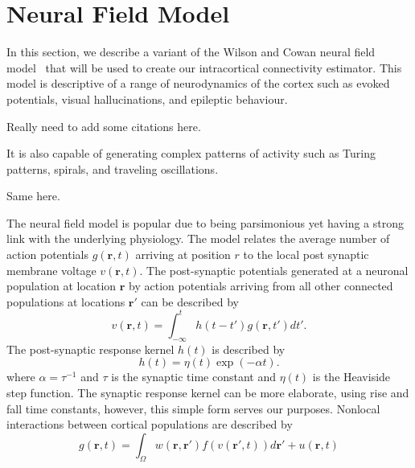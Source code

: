 \documentclass[onecolumn,draftcls]{IEEEtran}
\begin{document}
\section{Neural Field Model}
In this section, we describe a variant of the  Wilson and Cowan neural field model~\cite{Wilson1973} that will be used to create our intracortical connectivity estimator. This model is descriptive of a range of neurodynamics of the cortex such as evoked potentials, visual hallucinations, and epileptic behaviour. 
\begin{todo}
	{Really need to add some citations here.}
\end{todo}
It is also capable of generating complex patterns of activity such as Turing patterns, spirals, and traveling oscillations. 
\begin{todo}
	{Same here.}
\end{todo}
The neural field model is popular due to being parsimonious yet having a strong link with the underlying physiology. The model relates the average number of action potentials $g(\mathbf{r},t)$ arriving at position $r$ to the local post synaptic membrane voltage $v(\mathbf{r},t)$. The post-synaptic potentials generated at a neuronal population at location $\mathbf{r}$ by action potentials arriving from all other connected populations at locations $\mathbf{r}'$ can be described by
\begin{equation}\label{SpikesToPotential}
	v\left( {\mathbf{r},t} \right) = \int_{ - \infty }^t {h\left( {t - t'} \right)g\left( {\mathbf{r},t'} \right)dt'}.
\end{equation}
The post-synaptic response kernel $h(t)$ is described by
\begin{equation}\label{SynapticRespKernel}
	h(t) = \eta(t)\exp{\left(-\alpha t\right)}.
\end{equation}
where $\alpha=\tau^{-1}$ and $\tau$ is the synaptic time constant and $\eta(t)$ is the Heaviside step function. The synaptic response kernel can be more elaborate, using rise and fall time constants, however, this simple form serves our purposes. Nonlocal interactions between cortical populations are described by	
\begin{equation}\label{RateBasedInteractions}
	g\left( \mathbf{r},t \right) = \int_\Omega  {w\left( \mathbf{r},\mathbf{r}' \right)f\left( v\left( \mathbf{r}',t \right) \right)d\mathbf{r}'} + u\left(\mathbf{r},t\right)
\end{equation}
\end{document}
